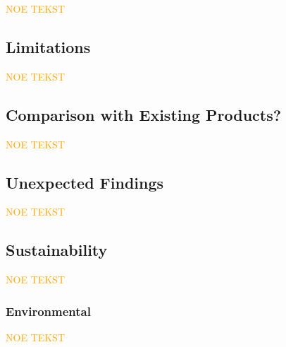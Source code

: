 \textcolor{orange}{NOE TEKST}

\subsection{Limitations}

\textcolor{orange}{NOE TEKST}

\subsection{Comparison with Existing Products?} 

\textcolor{orange}{NOE TEKST}

\subsection{Unexpected Findings} %

\textcolor{orange}{NOE TEKST}

\subsection{Sustainability} %

\textcolor{orange}{NOE TEKST}

\subsubsection*{Environmental}

\textcolor{orange}{NOE TEKST}
\begin{comment}
LENKE FRA PETER: https://www.ntnu.edu/web/excited/sustainability-in-computing-education
- mer lukkede hogstformer og mindre bruk av flatehogst 
- **lavere drivstofforbruk og smartere kjøring med skogsmaskin** 
    - **lavere førerbelastning**
    - **mindre terrengslitasje**
    - **høyere produktivitet**
- produsere tømmer som er mest mulig tilpasset industriens behov 
- **videreutvikle teknologi for driftsoppfølging og førerstøtte for maskinførerne** 

###########################
FNs Bærekraftsmål som virker relevante (KANSKJE SAMMENLIGN MED HVA NORGE GJØR I DAG?):
- 9
- 12 (?) VIRKER SOM DEN FOKUSERER MEST PÅ UTVIKLINGSLAND?
- 15 (?)
\end{comment}

